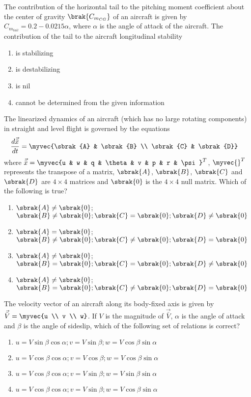 	\item 
	The contribution of the horizontal tail to the pitching moment coefficient about the center of gravity $\brak{C_{m_{CG}}}$ of an aircraft is given by $C_{m_{tail}} = 0.2 - 0.0215\alpha$, where $\alpha$ is the angle of attack of the aircraft. The contribution of the tail to the aircraft longitudinal stability
		\begin{enumerate}
			\item is stabilizing
			\item is destabilizing
			\item is nil
			\item cannot be determined from the given information
		\end{enumerate}
	\item
	The linearized dynamics of an aircraft (which has no large rotating components) in straight and level flight is governed by the equations
	\begin{align}
		\frac{d\vec{\bar{x}}}{dt} &= \myvec{\sbrak{A} & \sbrak{B} \\ \sbrak{C} & \sbrak{D}}
	\end{align}
	where $\vec{\bar{x}} = \myvec{u & w & q & \theta & v & p & r & \psi}^{T}$, $\myvec{{}}^{T}$ represents the transpose of a matrix, $\sbrak{A}$, $\sbrak{B}$, $\sbrak{C}$ and $\sbrak{D}$ are $4 \times 4$ matrices and $\sbrak{0}$ is the $4 \times 4$ null matrix. Which of the following is true?
		\begin{enumerate}
			\item $\sbrak{A} \neq \sbrak{0}$; $\sbrak{B} \neq \sbrak{0}; \sbrak{C} = \sbrak{0}; \sbrak{D} \neq \sbrak{0}$
			\item $\sbrak{A} = \sbrak{0}$; $\sbrak{B} \neq \sbrak{0}; \sbrak{C} \neq \sbrak{0}; \sbrak{D} = \sbrak{0}$
			\item $\sbrak{A} \neq \sbrak{0}$; $\sbrak{B} = \sbrak{0}; \sbrak{C} = \sbrak{0}; \sbrak{D} \neq \sbrak{0}$
			\item $\sbrak{A} \neq \sbrak{0}$; $\sbrak{B} = \sbrak{0}; \sbrak{C} \neq \sbrak{0}; \sbrak{D} = \sbrak{0}$
		\end{enumerate}
	\item
	The velocity vector of an aircraft along its body-fixed axis is given by $\vec{\bar{V}} = \myvec{u \\ v \\ w}$. If $V$ is the magnitude of $\vec{\bar{V}}$, $\alpha$ is the angle of attack and $\beta$ is the angle of sideslip, which of the following set of relations is correct?
		\begin{enumerate}
			\item $u = V\sin{\beta}\cos{\alpha}; v = V\sin{\beta}; w = V\cos{\beta}\sin{\alpha}$
			\item $u = V\cos{\beta}\cos{\alpha}; v = V\cos{\beta}; w = V\cos{\beta}\sin{\alpha}$
			\item $u = V\cos{\beta}\cos{\alpha}; v = V\sin{\beta}; w = V\sin{\beta}\sin{\alpha}$
			\item $u = V\cos{\beta}\cos{\alpha}; v = V\sin{\beta}; w = V\cos{\beta}\sin{\alpha}$
		\end{enumerate}
